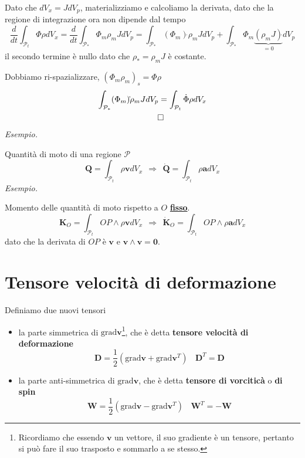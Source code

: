 \documentclass[10pt,a4paper,twoside]{book}
\begin{document}
Dato che $dV_{x} =JdV_{p}$, materializziamo e calcoliamo la derivata, dato che la regione di integrazione ora non dipende dal tempo
\begin{equation*}
\frac{d}{dt}\int _{\mathcal{P}_{t}} \Phi \rho dV_{x} =\frac{d}{dt}\int _{\mathcal{P}_{*}} \Phi _{m} \rho _{m} JdV_{p} =\int _{\mathcal{P}_{*}}( \Phi _{m})\dot{} \rho _{m} JdV_{p} +\int _{\mathcal{P}_{*}} \Phi _{m}\underbrace{( \rho _{m} J)\dot{}}_{=0} dV_{p}
\end{equation*}
il secondo termine è nullo dato che $\rho _{*} =\rho _{m} J$ è costante.

Dobbiamo ri-spazializzare, $( \Phi _{m} \rho _{m})_{s} =\Phi \rho $
\begin{gather*}
\int _{\mathcal{P}_{*}}( \Phi _{m})\dot{} \rho _{m} JdV_{p} =\int _{\mathcal{P}_{t}}\dot{\Phi } \rho dV_{x}\\
\qed 
\end{gather*}
\textit{Esempio.}

Quantità di moto di una regione $\mathcal{P}$
\begin{equation*}
\boxed{\mathbf{Q} =\int _{\mathcal{P}_{t}} \rho \mathbf{v} dV_{x} \ \ \Rightarrow \ \ \dot{\mathbf{Q}} =\int _{\mathcal{P}_{t}} \rho \mathbf{a} dV_{x}}
\end{equation*}
\textit{Esempio.}

Momento delle quantità di moto rispetto a $O$ \underline{\textbf{fisso}}.
\begin{equation*}
\boxed{\mathbf{K}_{O} =\int _{\mathcal{P}_{t}} OP\land \rho \mathbf{v} dV_{x} \ \ \Rightarrow \ \ \dot{\mathbf{K}}_{O} =\int _{\mathcal{P}_{t}} OP\land \rho \mathbf{a} dV_{x}}
\end{equation*}
dato che la derivata di $OP$ è $\mathbf{v}$ e $\mathbf{v} \land \mathbf{v} =\mathbf{0}$.
\section{Tensore velocità di deformazione}

Definiamo due nuovi tensori
\begin{itemize}
\item la parte simmetrica di $\mathrm{grad}\mathbf{v}$\footnote{Ricordiamo che essendo $\mathbf{v}$ un vettore, il suo gradiente è un tensore, pertanto si può fare il suo trasposto e sommarlo a se stesso.}, che è detta \textbf{tensore velocità di deformazione}\begin{equation*}
\boxed{\mathbf{D} =\frac{1}{2}\left(\mathrm{grad}\mathbf{v} +\mathrm{grad}\mathbf{v}^{T}\right)} \ \ \ \ \mathbf{D}^{T} =\mathbf{D}
\end{equation*}
\item la parte anti-simmetrica di $\mathrm{grad}\mathbf{v}$, che è detta \textbf{tensore di vorciticà} o\textbf{ di spin}\begin{equation*}
\boxed{\mathbf{W} =\frac{1}{2}\left(\mathrm{grad}\mathbf{v} -\mathrm{grad}\mathbf{v}^{T}\right)} \ \ \ \ \mathbf{W}^{T} =-\mathbf{W}
\end{equation*}
\end{itemize}
\end{document}
